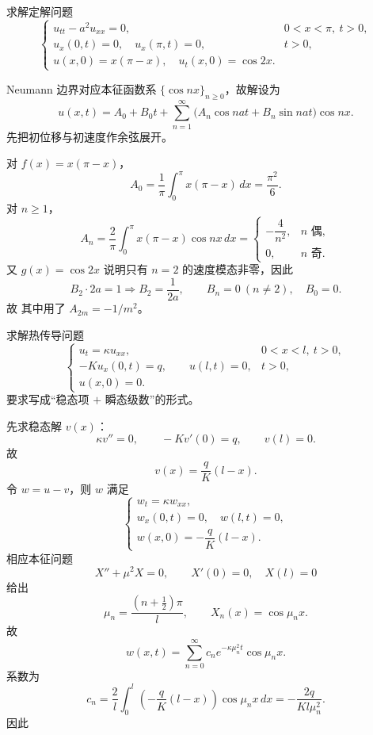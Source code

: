 \begin{question}
求解定解问题
\[
\begin{cases}
 u_{tt}-a^2u_{xx}=0, & 0<x<\pi,\ t>0,\\
 u_x(0,t)=0,\quad u_x(\pi,t)=0, & t>0,\\
 u(x,0)=x(\pi-x),\quad u_t(x,0)=\cos 2x.
\end{cases}
\]

\begin{solution}

Neumann 边界对应本征函数系 $\{\cos nx\}_{n\ge0}$，故解设为
\[
u(x,t)=A_0+B_0t+\sum_{n=1}^{\infty}\bigl(A_n\cos nat+B_n\sin nat\bigr)\cos nx.
\]
先把初位移与初速度作余弦展开。

对 $f(x)=x(\pi-x)$，
\[
A_0=\frac1\pi\int_0^{\pi}x(\pi-x)\,dx=\frac{\pi^2}{6}.
\]
对 $n\ge1$，
\[
A_n=\frac{2}{\pi}\int_0^{\pi}x(\pi-x)\cos nx\,dx
=\begin{cases}
-\dfrac{4}{n^2},& n\text{ 偶},\\[0.3em]
0,& n\text{ 奇}.
\end{cases}
\]
又 $g(x)=\cos2x$ 说明只有 $n=2$ 的速度模态非零，因此
\[
B_2\cdot 2a=1\Longrightarrow B_2=\frac1{2a},\qquad B_n=0\ (n\ne2),\quad B_0=0.
\]
故
其中用了 $A_{2m}=-1/m^2$。
\end{solution}
\end{question}

\begin{question}
求解热传导问题
\[
\begin{cases}
 u_t=\kappa u_{xx}, & 0<x<l,\ t>0,\\
 -K u_x(0,t)=q,\qquad u(l,t)=0, & t>0,\\
 u(x,0)=0.
\end{cases}
\]
要求写成“稳态项 $+$ 瞬态级数”的形式。
\begin{solution}

先求稳态解 $v(x)$：
\[
\kappa v''=0,
\qquad -K v'(0)=q,
\qquad v(l)=0.
\]
故
\[
 v(x)=\frac{q}{K}(l-x).
\]
令 $w=u-v$，则 $w$ 满足
\[
\begin{cases}
 w_t=\kappa w_{xx},\\
 w_x(0,t)=0,\quad w(l,t)=0,\\
 w(x,0)=-\dfrac{q}{K}(l-x).
\end{cases}
\]
相应本征问题
\[
X''+\mu^2X=0,
\qquad X'(0)=0,
\quad X(l)=0
\]
给出
\[
\mu_n=\frac{(n+\tfrac12)\pi}{l},\qquad X_n(x)=\cos\mu_n x.
\]
故
\[
 w(x,t)=\sum_{n=0}^{\infty}c_n e^{-\kappa\mu_n^2 t}\cos\mu_n x.
\]
系数为
\[
 c_n=\frac{2}{l}\int_0^l\left(-\frac{q}{K}(l-x)\right)\cos\mu_n x\,dx
 =-\frac{2q}{Kl\mu_n^2}.
\]
因此
\end{solution}
\end{question}

